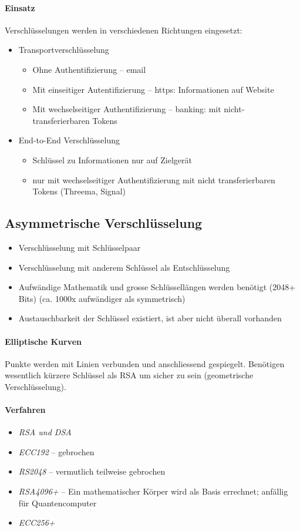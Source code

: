 \documentclass[a4paper,12pt]{article}
\begin{document}
\paragraph{Einsatz}
Verschlüsselungen werden in verschiedenen Richtungen eingesetzt:
\begin{itemize}
\item Transportverschlüsselung
  \begin{itemize}
  \item Ohne Authentifizierung -- email
  \item Mit einseitiger Autentifizierung -- https: Informationen auf Website
  \item Mit wechselseitiger Authentifizierung -- banking: mit nicht-transferierbaren Tokens
  \end{itemize}
\item End-to-End Verschlüsselung
  \begin{itemize}
  \item Schlüssel zu Informationen nur auf Zielgerät
  \item nur mit wechselseitiger Authentifizierung mit nicht transferierbaren Tokens (Threema, Signal)
  \end{itemize}
\end{itemize}


\subsection{Asymmetrische Verschlüsselung}
\begin{itemize}
\item Verschlüsselung mit Schlüsselpaar
\item Verschlüsselung mit anderem Schlüssel als Entschlüsselung
\item Aufwändige Mathematik und grosse Schlüssellängen werden benötigt (2048+ Bits) (ca. 1000x aufwändiger als symmetrisch)
\item Austauschbarkeit der Schlüssel existiert, ist aber nicht überall vorhanden
\end{itemize}

\paragraph{Elliptische Kurven} Punkte werden mit Linien verbunden und anschliessend gespiegelt. Benötigen wesentlich kürzere Schlüssel als RSA um sicher zu sein (geometrische Verschlüsselung).

\paragraph{Verfahren}
\begin{itemize}
\item \emph{RSA und DSA}
\item \emph{ECC192} -- gebrochen
\item \emph{RS2048} -- vermutlich teilweise gebrochen
\item \emph{RSA4096+} -- Ein mathematischer Körper wird als Basis errechnet; anfällig für Quantencomputer
\item \emph{ECC256+}
\end{itemize}
\end{document}
